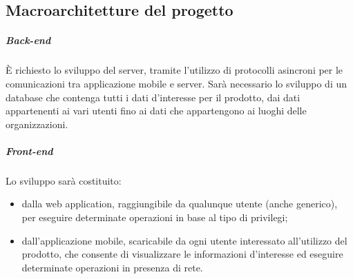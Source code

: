 \documentclass[../manuale-utente.tex]{subfiles}
\begin{document}
\subsection{Macroarchitetture del progetto}%
\label{sub:macroarchitetture_del_progetto}
\subparagraph*{Back-end}%
\label{par:back-end}
È richiesto lo sviluppo  del server, tramite l'utilizzo di protocolli asincroni per le comunicazioni tra applicazione mobile e server. Sarà necessario lo sviluppo di un database che contenga tutti i dati d'interesse per il prodotto, dai dati appartenenti ai vari utenti fino ai dati che appartengono ai luoghi delle organizzazioni.

\subparagraph*{Front-end}%
\label{par:front-end}
Lo sviluppo  sarà costituito:
\begin{itemize}
  \item dalla web application, raggiungibile da qualunque utente (anche generico), per eseguire determinate operazioni in base al tipo di privilegi;
  \item dall'applicazione mobile, scaricabile da ogni utente interessato all'utilizzo del prodotto, che consente di visualizzare le informazioni d'interesse ed eseguire determinate operazioni in presenza di rete.
\end{itemize}
\end{document}
